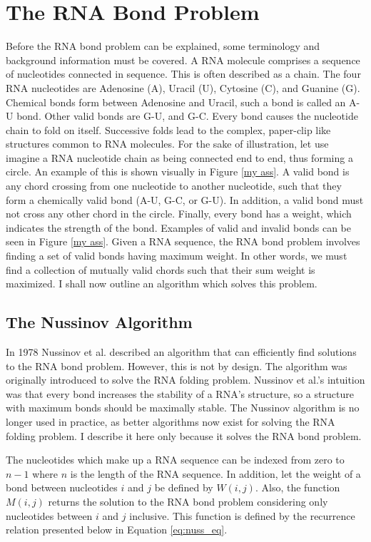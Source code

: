 \documentclass[12pt, a4paper]{article}
\begin{document}
\section{The RNA Bond Problem}
Before the RNA bond problem can be explained, some terminology and background information must be covered. A RNA molecule comprises a sequence of nucleotides connected in sequence. This is often described as a chain. The four RNA nucleotides are Adenosine (A), Uracil (U), Cytosine (C), and Guanine (G). Chemical bonds form between Adenosine and Uracil, such a bond is called an A-U bond. Other valid bonds are G-U, and G-C. Every bond causes the nucleotide chain to fold on itself. Successive folds lead to the complex, paper-clip like structures common to RNA molecules. For the sake of illustration, let use imagine a RNA nucleotide chain as being connected end to end, thus forming a circle. An example of this is shown visually in Figure \ref{my ass}. A valid bond is any chord crossing from one nucleotide to  another nucleotide, such that they form a chemically valid bond (A-U, G-C, or G-U). In addition, a valid bond must not cross any other chord in the circle. Finally, every bond has a weight, which indicates the strength of the bond. Examples of valid and invalid bonds can be seen in Figure \ref{my ass}. Given a RNA sequence, the RNA bond problem involves finding a set of valid bonds having maximum weight. In other words, we must find a collection of mutually valid chords such that their sum weight is maximized. I shall now outline an algorithm which solves this problem.

\subsection{The Nussinov Algorithm}
In 1978 Nussinov et al. \cite{nussinov1978algorithms} described an algorithm that can efficiently find solutions to the RNA bond problem. However, this is not by design. The algorithm was originally introduced to solve the RNA folding problem. Nussinov et al.'s intuition was that every bond increases the stability of a RNA's structure, so a structure with maximum bonds should be maximally stable. The Nussinov algorithm is no longer used in practice, as better algorithms now exist for solving the RNA folding problem. I describe it here only because it solves the RNA bond problem.

The nucleotides which make up a RNA sequence can be indexed from zero to $n-1$ where $n$ is the length of the RNA sequence. In addition, let the weight of a bond between nucleotides $i$ and $j$ be defined by $W(i,j)$. Also, the function $M(i,j)$ returns the solution to the RNA bond problem considering only nucleotides between $i$ and $j$ inclusive. This function is defined by the recurrence relation presented below in Equation \ref{eq:nuss_eq}.
\end{document}
